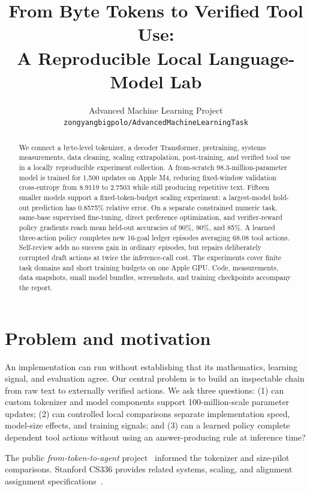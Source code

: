 \documentclass{article}
\title{From Byte Tokens to Verified Tool Use:\\
A Reproducible Local Language-Model Lab}
\author{Advanced Machine Learning Project\\
\texttt{zongyangbigpolo/AdvancedMachineLearningTask}}
\begin{document}
\maketitle

\begin{abstract}
We connect a byte-level tokenizer, a decoder Transformer, pretraining,
systems measurements, data cleaning, scaling extrapolation, post-training,
and verified tool use in a locally reproducible experiment collection.
A from-scratch 98.3-million-parameter model is trained for 1,500 updates on
Apple M4, reducing fixed-window validation cross-entropy from 8.9119 to
2.7503 while still producing repetitive text. Fifteen smaller models
support a fixed-token-budget scaling experiment: a largest-model hold-out
prediction has 0.8575\% relative error. On a separate constrained numeric
task, same-base supervised fine-tuning, direct preference optimization,
and verifier-reward policy gradients reach mean held-out accuracies of
90\%, 90\%, and 85\%. A learned three-action policy completes new
16-goal ledger episodes averaging 68.08 tool actions. Self-review adds
no success gain in ordinary episodes, but repairs deliberately corrupted
draft actions at twice the inference-call cost. The experiments cover
finite task domains and short training budgets on one Apple GPU.
Code, measurements, data snapshots, small model
bundles, screenshots, and training checkpoints accompany the report.
\end{abstract}

\section{Problem and motivation}

An implementation can run without establishing that its mathematics,
learning signal, and evaluation agree. Our central problem is to build an
inspectable chain from raw text to externally verified actions. We ask
three questions:
(1) can custom tokenizer and model components support
100-million-scale parameter updates; (2) can controlled local comparisons
separate implementation speed, model-size effects, and training signals;
and (3) can a learned policy complete dependent tool actions without using
an answer-producing rule at inference time?

The public \emph{from-token-to-agent} project~\citep{referenceproject} informed the tokenizer and
size-pilot comparisons. Stanford CS336 provides related systems, scaling,
and alignment assignment specifications~\citep{cs336}.
\end{document}
